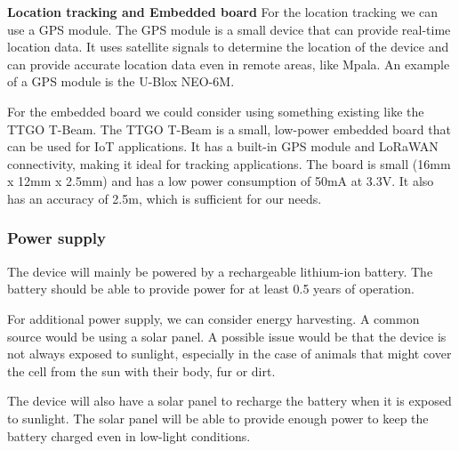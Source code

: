 \textbf{Location tracking and Embedded board}
For the location tracking we can use a GPS module. The GPS module is a small device that can provide real-time location data. It uses satellite signals to determine the location of the device and can provide accurate location data even in remote areas, like Mpala. An example of a GPS module is the U-Blox NEO-6M.

For the embedded board we could consider using something existing like the TTGO T-Beam. The TTGO T-Beam is a small, low-power embedded board that can be used for IoT applications. It has a built-in GPS module and LoRaWAN connectivity, making it ideal for tracking applications. The board is small (16mm x 12mm x 2.5mm) and has a low power consumption of 50mA at 3.3V. It also has an accuracy of 2.5m, which is sufficient for our needs.

\subsubsection{Power supply}
The device will mainly be powered by a rechargeable lithium-ion battery. The battery should be able to provide power for at least 0.5 years of operation. 


For additional power supply, we can consider energy harvesting. 
A common source would be using a solar panel. A possible issue would be that the device is not always exposed to sunlight, especially in the case of animals that might cover the cell from the sun with their body, fur or dirt.


The device will also have a solar panel to recharge the battery when it is exposed to sunlight. The solar panel will be able to provide enough power to keep the battery charged even in low-light conditions.

